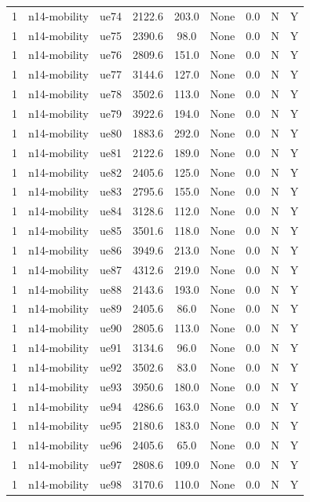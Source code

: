 \begin{table}[ht]
\begin{tabular}{|c|c|c|c|c|c|c|c|c|}
1 & n14-mobility & ue74 & 2122.6 & 203.0 & None & 0.0 & N & Y \\
1 & n14-mobility & ue75 & 2390.6 & 98.0 & None & 0.0 & N & Y \\
1 & n14-mobility & ue76 & 2809.6 & 151.0 & None & 0.0 & N & Y \\
1 & n14-mobility & ue77 & 3144.6 & 127.0 & None & 0.0 & N & Y \\
1 & n14-mobility & ue78 & 3502.6 & 113.0 & None & 0.0 & N & Y \\
1 & n14-mobility & ue79 & 3922.6 & 194.0 & None & 0.0 & N & Y \\
1 & n14-mobility & ue80 & 1883.6 & 292.0 & None & 0.0 & N & Y \\
1 & n14-mobility & ue81 & 2122.6 & 189.0 & None & 0.0 & N & Y \\
1 & n14-mobility & ue82 & 2405.6 & 125.0 & None & 0.0 & N & Y \\
1 & n14-mobility & ue83 & 2795.6 & 155.0 & None & 0.0 & N & Y \\
1 & n14-mobility & ue84 & 3128.6 & 112.0 & None & 0.0 & N & Y \\
1 & n14-mobility & ue85 & 3501.6 & 118.0 & None & 0.0 & N & Y \\
1 & n14-mobility & ue86 & 3949.6 & 213.0 & None & 0.0 & N & Y \\
1 & n14-mobility & ue87 & 4312.6 & 219.0 & None & 0.0 & N & Y \\
1 & n14-mobility & ue88 & 2143.6 & 193.0 & None & 0.0 & N & Y \\
1 & n14-mobility & ue89 & 2405.6 & 86.0 & None & 0.0 & N & Y \\
1 & n14-mobility & ue90 & 2805.6 & 113.0 & None & 0.0 & N & Y \\
1 & n14-mobility & ue91 & 3134.6 & 96.0 & None & 0.0 & N & Y \\
1 & n14-mobility & ue92 & 3502.6 & 83.0 & None & 0.0 & N & Y \\
1 & n14-mobility & ue93 & 3950.6 & 180.0 & None & 0.0 & N & Y \\
1 & n14-mobility & ue94 & 4286.6 & 163.0 & None & 0.0 & N & Y \\
1 & n14-mobility & ue95 & 2180.6 & 183.0 & None & 0.0 & N & Y \\
1 & n14-mobility & ue96 & 2405.6 & 65.0 & None & 0.0 & N & Y \\
1 & n14-mobility & ue97 & 2808.6 & 109.0 & None & 0.0 & N & Y \\
1 & n14-mobility & ue98 & 3170.6 & 110.0 & None & 0.0 & N & Y \\

\end{tabular}
\end{table}
